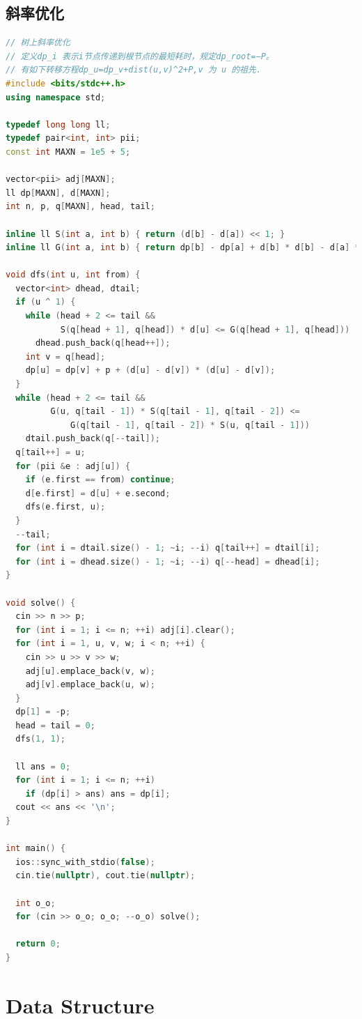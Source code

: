 \documentclass[twoside]{article}
\begin{document}
\subsection{斜率优化}
\begin{lstlisting}[language=c++]
// 树上斜率优化
// 定义dp_i 表示i节点传递到根节点的最短耗时，规定dp_root=−P。
// 有如下转移方程dp_u=dp_v+dist(u,v)^2+P,v 为 u 的祖先.
#include <bits/stdc++.h>
using namespace std;

typedef long long ll;
typedef pair<int, int> pii;
const int MAXN = 1e5 + 5;

vector<pii> adj[MAXN];
ll dp[MAXN], d[MAXN];
int n, p, q[MAXN], head, tail;

inline ll S(int a, int b) { return (d[b] - d[a]) << 1; }
inline ll G(int a, int b) { return dp[b] - dp[a] + d[b] * d[b] - d[a] * d[a]; }

void dfs(int u, int from) {
  vector<int> dhead, dtail;
  if (u ^ 1) {
    while (head + 2 <= tail &&
           S(q[head + 1], q[head]) * d[u] <= G(q[head + 1], q[head]))
      dhead.push_back(q[head++]);
    int v = q[head];
    dp[u] = dp[v] + p + (d[u] - d[v]) * (d[u] - d[v]);
  }
  while (head + 2 <= tail &&
         G(u, q[tail - 1]) * S(q[tail - 1], q[tail - 2]) <=
             G(q[tail - 1], q[tail - 2]) * S(u, q[tail - 1]))
    dtail.push_back(q[--tail]);
  q[tail++] = u;
  for (pii &e : adj[u]) {
    if (e.first == from) continue;
    d[e.first] = d[u] + e.second;
    dfs(e.first, u);
  }
  --tail;
  for (int i = dtail.size() - 1; ~i; --i) q[tail++] = dtail[i];
  for (int i = dhead.size() - 1; ~i; --i) q[--head] = dhead[i];
}

void solve() {
  cin >> n >> p;
  for (int i = 1; i <= n; ++i) adj[i].clear();
  for (int i = 1, u, v, w; i < n; ++i) {
    cin >> u >> v >> w;
    adj[u].emplace_back(v, w);
    adj[v].emplace_back(u, w);
  }
  dp[1] = -p;
  head = tail = 0;
  dfs(1, 1);

  ll ans = 0;
  for (int i = 1; i <= n; ++i)
    if (dp[i] > ans) ans = dp[i];
  cout << ans << '\n';
}

int main() {
  ios::sync_with_stdio(false);
  cin.tie(nullptr), cout.tie(nullptr);

  int o_o;
  for (cin >> o_o; o_o; --o_o) solve();

  return 0;
}

\end{lstlisting}

\section{Data Structure}
\end{document}
